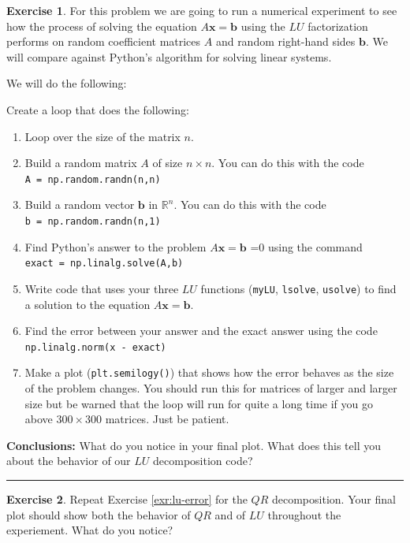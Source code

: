 \documentclass[
]{book}
\providecommand{\tightlist}{%
  \setlength{\itemsep}{0pt}\setlength{\parskip}{0pt}}
\theoremstyle{definition}
\theoremstyle{definition}
\theoremstyle{definition}
\newtheorem{exercise}{Exercise}[chapter]
\theoremstyle{remark}
\begin{document}
\begin{exercise}
\protect\hypertarget{exr:lu-error}{}{\label{exr:lu-error} }For this problem we are going to run a numerical experiment to see how the process of solving the equation \(A \boldsymbol{x} = \boldsymbol{b}\) using the \(LU\) factorization performs on random coefficient matrices \(A\) and random right-hand sides \(\boldsymbol{b}\). We will compare against Python's algorithm for solving linear systems.

We will do the following:

Create a loop that does the following:

\begin{enumerate}
\def\labelenumi{\alph{enumi}.}
\tightlist
\item
  Loop over the size of the matrix \(n\).
\item
  Build a random matrix \(A\) of size \(n \times n\). You can do this with the code \texttt{A\ =\ np.random.randn(n,n)}
\item
  Build a random vector \(\boldsymbol{b}\) in \(\mathbb{R}^{n}\). You can do this with the code \texttt{b\ =\ np.random.randn(n,1)}
\item
  Find Python's answer to the problem \(A\boldsymbol{x}=\boldsymbol{b}\) =0 using the command \texttt{exact\ =\ np.linalg.solve(A,b)}
\item
  Write code that uses your three \(LU\) functions (\texttt{myLU}, \texttt{lsolve}, \texttt{usolve}) to find a solution to the equation \(A\boldsymbol{x}=\boldsymbol{b}\).
\item
  Find the error between your answer and the exact answer using the code \texttt{np.linalg.norm(x\ -\ exact)}
\item
  Make a plot (\texttt{plt.semilogy()}) that shows how the error behaves as the size of the problem changes. You should run this for matrices of larger and larger size but be warned that the loop will run for quite a long time if you go above \(300 \times 300\) matrices. Just be patient.
\end{enumerate}

\textbf{Conclusions:} What do you notice in your final plot. What does this tell you about the behavior of our \(LU\) decomposition code?
\end{exercise}

\begin{center}\rule{0.5\linewidth}{0.5pt}\end{center}

\begin{exercise}
\protect\hypertarget{exr:unnamed-chunk-388}{}{\label{exr:unnamed-chunk-388} }Repeat Exercise \ref{exr:lu-error} for the \(QR\) decomposition. Your final plot should show both the behavior of \(QR\) and of \(LU\) throughout the experiement. What do you notice?
\end{exercise}
\end{document}
